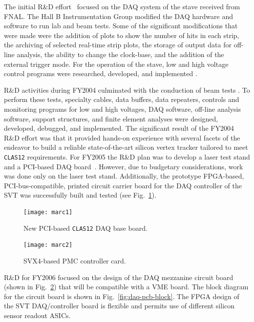 The initial R\&D effort~\cite{CN2005-009,CN2005-016} focused on the DAQ 
system of the stave received from FNAL.  The Hall B Instrumentation 
Group modified the DAQ hardware and software to run lab and beam tests.  
Some of the significant modifications that were made were the addition of 
plots to show the number of hits in each strip, the archiving of selected 
real-time strip plots, the storage of output data for off-line analysis, 
the ability to change the clock-base, and the addition of the external 
trigger mode.  For the operation of the stave, low and high voltage control 
programs were researched, developed, and implemented
\cite{CN2005-017,CN2005-018}.  

R\&D activities during FY2004 culminated with the conduction of beam tests
\cite{CN2005-020}.  To perform these tests, specialty cables, data 
buffers, data repeaters, controls and monitoring programs for low and high 
voltages, DAQ software, off-line analysis software, support structures, and 
finite element analyses were designed, developed, debugged, and implemented.  
The significant result of the FY2004 R\&D effort was that it provided 
hands-on experience with several facets of the endeavor to build a reliable 
state-of-the-art silicon vertex tracker tailored to meet {\tt CLAS12} 
requirements.  For FY2005 the R\&D plan was to develop a laser test stand 
and a PCI-based DAQ board~\cite{CN2005-019}.  However, due to budgetary 
considerations, work was done only on the laser test stand.  Additionally,
the prototype FPGA-based, PCI-bus-compatible, printed circuit carrier board 
for the DAQ controller of the SVT was successfully built and tested
\cite{CN2006-010} (see Fig.~\ref{fig:marc1}). 

\begin{figure}[htbp]
\centering
\texttt{[image: marc1]}
\caption{\small{New PCI-based {\tt CLAS12} DAQ base board.}}
\label{fig:marc1}
\end{figure}

\begin{figure}[htbp]
\centering
\texttt{[image: marc2]}
\caption{\small{SVX4-based PMC controller card.}}
\label{fig:marc2}
\end{figure}

R\&D for FY2006 focused on the design of the DAQ mezzanine circuit board
(shown in Fig.~\ref{fig:marc2}) that will be compatible with a VME board.  
The block diagram for the circuit board is shown in 
Fig.~\ref{fig:daq-pcb-block}.  The FPGA design of the SVT DAQ/controller 
board is flexible and permits use of different silicon sensor readout ASICs.

